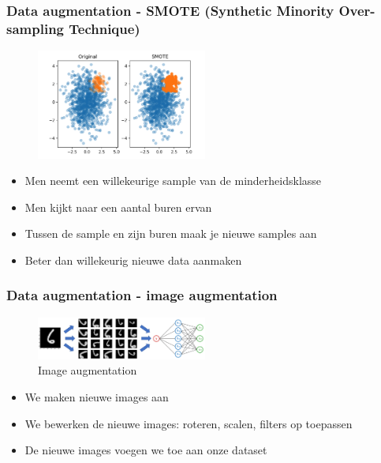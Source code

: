 \documentclass{article}
\begin{document}
\subsubsection{Data augmentation - SMOTE (Synthetic Minority Over-sampling Technique)}

\begin{figure}[H]
    \centering
    \includegraphics[width=0.5\textwidth]{smote.png}
\end{figure}

\begin{itemize}
    \item Men neemt een willekeurige sample van de minderheidsklasse
    \item Men kijkt naar een aantal buren ervan
    \item Tussen de sample en zijn buren maak je nieuwe samples aan
    \item Beter dan willekeurig nieuwe data aanmaken
\end{itemize}

\subsubsection{Data augmentation - image augmentation}

\begin{figure}[H]
    \centering
    \includegraphics[width=0.5\textwidth]{image-augmentation.png}
    \caption{Image augmentation}
\end{figure}

\begin{itemize}
    \item We maken nieuwe images aan
    \item We bewerken de nieuwe images: roteren, scalen, filters op toepassen
    \item De nieuwe images voegen we toe aan onze dataset
\end{itemize}
\end{document}
